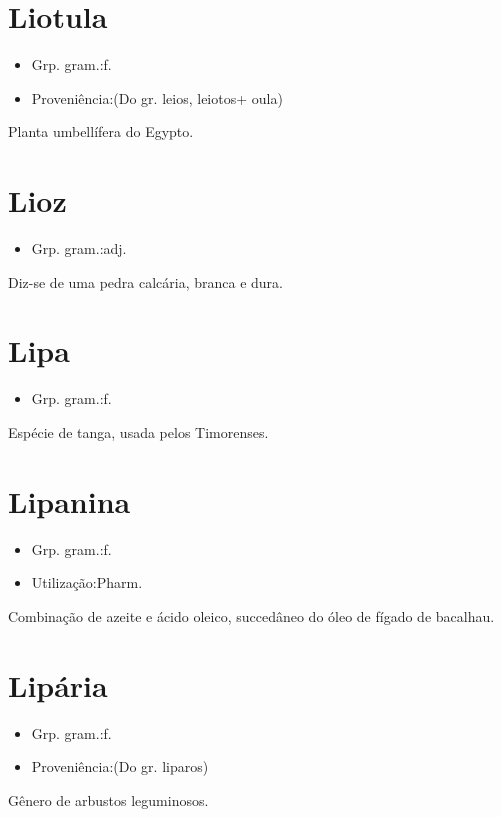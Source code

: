 \section{Liotula}
\begin{itemize}
\item {Grp. gram.:f.}
\end{itemize}
\begin{itemize}
\item {Proveniência:(Do gr. \textunderscore leios\textunderscore , \textunderscore leiotos\textunderscore  + \textunderscore oula\textunderscore )}
\end{itemize}
Planta umbellífera do Egypto.
\section{Lioz}
\begin{itemize}
\item {Grp. gram.:adj.}
\end{itemize}
Diz-se de uma pedra calcária, branca e dura.
\section{Lipa}
\begin{itemize}
\item {Grp. gram.:f.}
\end{itemize}
Espécie de tanga, usada pelos Timorenses.
\section{Lipanina}
\begin{itemize}
\item {Grp. gram.:f.}
\end{itemize}
\begin{itemize}
\item {Utilização:Pharm.}
\end{itemize}
Combinação de azeite e ácido oleico, succedâneo do óleo de fígado de bacalhau.
\section{Lipária}
\begin{itemize}
\item {Grp. gram.:f.}
\end{itemize}
\begin{itemize}
\item {Proveniência:(Do gr. \textunderscore liparos\textunderscore )}
\end{itemize}
Gênero de arbustos leguminosos.
